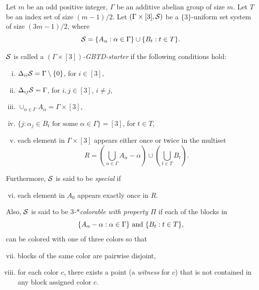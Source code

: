 \documentclass[draft, 11pt]{article}
\begin{document}
\begin{definition}
 \label{defn:starter} Let $m$ be an odd positive integer, $\Gamma$ be
 an additive abelian group of size $m$. Let $T$ be an index set of
 size $(m-1)/2$. Let $(\Gamma\times[3],\mathcal S)$ be a
 $\{3\}$-uniform set system of size $(3m-1)/2$, where
 \begin{equation*}
 \mathcal S =\{A_\alpha: \alpha\in\Gamma\} \cup \{B_t: t\in T\}.
 \end{equation*}

 $\mathcal S$ is called a {\em $(\Gamma\times[3])$-GBTD-starter} if the
 following conditions hold:
 \begin{enumerate}[(i)]
 \item $\Delta_{ii}\mathcal S=\Gamma\setminus\{0\}$, for $i\in[3]$,
 \item $\Delta_{ij}\mathcal S=\Gamma$, for $i,j\in [3]$, $i\not=j$,
 \item $\cup_{\alpha\in\Gamma} A_\alpha = \Gamma\times[3]$,
 \item $\{j: \text{$\alpha_j\in B_t$ for some $\alpha\in\Gamma$}\}=[3]$, for $t\in T$,
 \item each element in $\Gamma\times[3]$ appears either once or twice in the multiset
 \begin{equation*}
 R =  \left(\bigcup_{\alpha\in\Gamma} A_\alpha-\alpha\right) \cup
 \left( \bigcup_{t\in T} B_t \right).
 \end{equation*}\end{enumerate}
  Furthermore, $\mathcal S$ is said to be \emph{special} if
 \begin{enumerate}[(i)]
 \setcounter{enumi}{5}
 \item each element in $A_0$ appears exactly once in $R$. %
 \end{enumerate}
 Also, $\mathcal S$ is said to be {\em $3$-$*$colorable with property $\Pi$} if each of the blocks in
 \begin{equation*}
\setcounter{enumi}{6}
\{A_\alpha-\alpha:\alpha\in\Gamma\} {\rm\ and\ } \{B_t: t\in T\},
\end{equation*}
\noindent can be colored with one of three colors so that
\begin{enumerate}[(i)]
\setcounter{enumi}{6}
\item blocks of the same color are pairwise disjoint,
\item for each color $c$, there exists a point (a {\em witness} for $c$)
that is not contained in any block assigned color $c$.
\end{enumerate}
 \end{definition}
\end{document}
